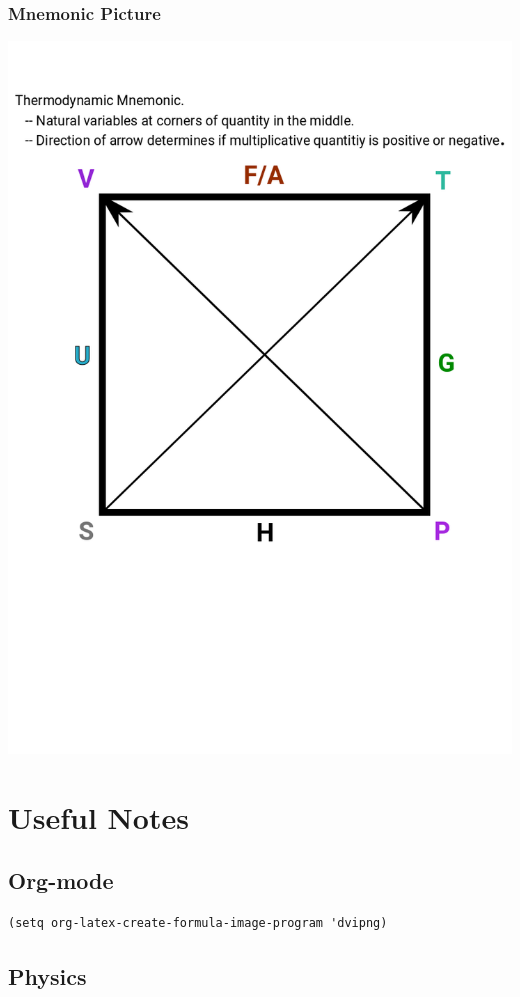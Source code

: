 \documentclass[11pt]{article}
\begin{document}
\begin{enumerate}
\subsubsection{Mnemonic Picture}
\label{sec:orgc27be44}
\begin{center}
\includegraphics[width=.9\linewidth]{Images/Thermodynamic_mnemonic.png}
\end{center}

\section{Useful Notes}
\label{sec:orge9bcc02}
\subsection{Org-mode}
\label{sec:org120a75d}
\begin{verbatim}
(setq org-latex-create-formula-image-program 'dvipng)
\end{verbatim}

\subsection{Physics}
\label{sec:org888a0c7}

\end{enumerate}
\end{document}
